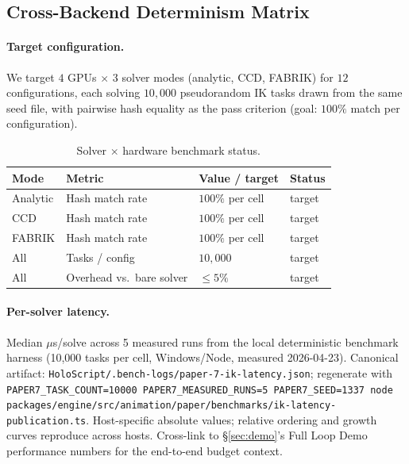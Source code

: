 \documentclass[sigconf,nonacm]{acmart}
\newcommand{\fabrik}{\textsc{FABRIK}}
\newcommand{\ccd}{\textsc{CCD}}
\begin{document}
\subsection{Cross-Backend Determinism Matrix}
\label{sec:ik:matrix}

\paragraph{Target configuration.}
We target $4$ GPUs $\times$ $3$ solver modes (analytic, \ccd{}, \fabrik{})
for $12$ configurations, each solving $10{,}000$ pseudorandom IK tasks
drawn from the same seed file, with pairwise hash equality as the pass
criterion (goal: $100\%$ match per configuration).

\begin{table}[t]
  \centering
  \caption{Solver $\times$ hardware benchmark status.}
  \label{tab:ik-matrix-unified}
  \footnotesize
  \begin{tabular}{@{}llll@{}}
    \toprule
    \textbf{Mode} & \textbf{Metric} & \textbf{Value / target} & \textbf{Status} \\
    \midrule
    Analytic & Hash match rate & $100\%$ per cell & target \\
    \ccd{} & Hash match rate & $100\%$ per cell & target \\
    \fabrik{} & Hash match rate & $100\%$ per cell & target \\
    All & Tasks / config & $10{,}000$ & target \\
    All & Overhead vs.\ bare solver & $\leq 5\%$ & target \\
    \bottomrule
  \end{tabular}
\end{table}

\paragraph{Per-solver latency.}
Median $\mu$s/solve across 5 measured runs from the local deterministic
benchmark harness (10{,}000 tasks per cell, Windows/Node, measured
2026-04-23). Canonical artifact:
\texttt{HoloScript/.bench-logs/paper-7-ik-latency.json}; regenerate with
\texttt{PAPER7\_TASK\_COUNT=10000 PAPER7\_MEASURED\_RUNS=5
PAPER7\_SEED=1337 node
packages/engine/src/animation/paper/benchmarks/ik-latency-publication.ts}.
Host-specific absolute values; relative ordering and growth curves
reproduce across hosts. Cross-link to \S\ref{sec:demo}'s Full Loop Demo
performance numbers for the end-to-end budget context.
\end{document}
